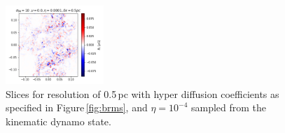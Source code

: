 \documentclass[preprint2]{aastex63}
\begin{document}
\begin{figure}
\includegraphics[trim=0.0cm 0.00cm 0.0cm 0.0cm,clip=true,width=0.33\textwidth]{csc_figs/bb105pcPm0e-4_02.png}
\caption{
Slices for resolution of 0.5\,pc with hyper diffusion coefficients as 
specified in Figure\,\ref{fig:brms}, and $\eta=10^{-4}$ sampled from the 
kinematic dynamo state.
\label{fig:05pcUB}
}
\end{figure}

\end{document}
